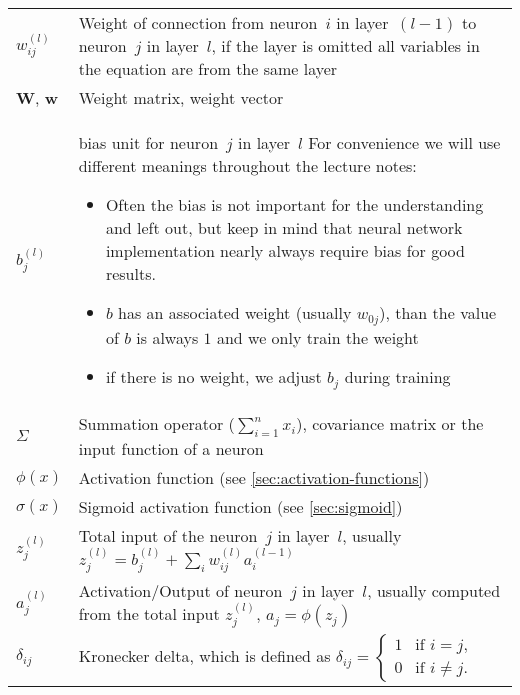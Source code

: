 \begin{tabularx}{\textwidth}{ l X }
\midrule %
$w_{ij}^{(l)}$	& Weight of connection from neuron~$i$ in layer~$(l-1)$ to neuron~$j$ in layer~$l$, if the layer is omitted all variables in the equation are from the same layer \\
$\mathbf{W}$, $\mathbf{w}$ & Weight matrix, weight vector \\
$b_j^{(l)}$	& bias unit for neuron~$j$ in layer~$l$ \newline For convenience we will use different meanings throughout the lecture notes:
				\begin{itemize}
				\item Often the bias is not important for the understanding and left out, but keep in mind that neural network implementation nearly always require bias for good results.
				\item $b$ has an associated weight (usually $w_{0j}$), than the value of $b$ is always $1$ and we only train the weight
				\item if there is no weight, we adjust $b_j$ during training
				\end{itemize} \\
$\Sigma$		& Summation operator (\eg $\sum_{i=1}^n x_i$), covariance matrix or the input function of a neuron \\
$\phi(x)$		& Activation function (see \ref{sec:activation-functions}) \\
$\sigma(x)$		& Sigmoid activation function (see \ref{sec:sigmoid}) \\
$z_j^{(l)}$		& Total input of the neuron~$j$ in layer~$l$, usually $z_j^{(l)} = b_j^{(l)} + \sum_i w_{ij}^{(l)} a_i^{(l-1)}$ \\
$a_j^{(l)}$		& Activation/Output of neuron~$j$ in layer~$l$, usually computed from the total input $z_j^{(l)}$, $a_j=\phi(z_j)$ \\

\midrule %
$\delta_{ij}$	&  Kronecker delta, which is defined as $\delta_{ij}=\begin{cases}1 &\text{if } i = j,\\0 &\text{if } i \neq j.\end{cases}$
\end{tabularx}